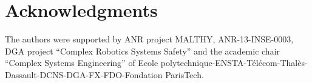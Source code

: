 \documentclass{sig-alternate-05-2015}
\begin{document}
\section{Acknowledgments}
The authors were supported by ANR project MALTHY, ANR-13-INSE-0003, DGA project ``Complex Robotics Systems Safety'' and the academic chair ``Complex Systems Engineering''
of Ecole polytechnique-ENS\-TA-T\'el\'ecom-Thal\`es-Dassault-DCNS-DGA-FX-FDO-Fondation ParisTech.



\end{document}
